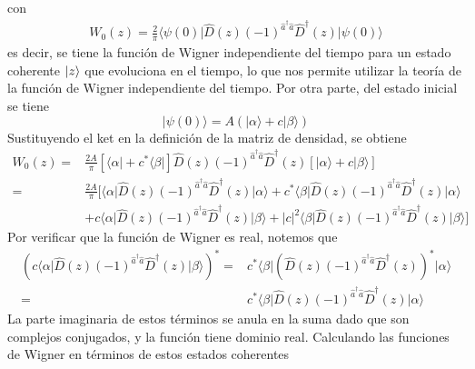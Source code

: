con
\begin{align*}
  W_{0}(z) = \frac{2}{\pi} \langle \psi(0)\vert \hat{D}(z) (-1)^{\hat{a}^{\dagger}\hat{a}} \hat{D}^{\dagger}(z) \vert \psi(0) \rangle
\end{align*}
es decir, se tiene la función de Wigner independiente del tiempo para un estado coherente $\ket{z}$ que evoluciona en el tiempo, lo que nos permite utilizar la teoría de la función de Wigner independiente del tiempo. Por otra parte, del estado inicial se tiene
\begin{equation*}
  \vert \psi(0) \rangle = A \left(\vert \alpha \rangle + c \vert  \beta\rangle \right)
\end{equation*}
Sustituyendo el ket en la definición de la matriz de densidad, se obtiene
\begin{align*}
  W_0(z) = & \frac{2A}{\pi} \left[ \langle \alpha \vert + c^* \langle \beta \vert \right] \hat{D}(z) (-1)^{\hat{a}^\dagger \hat{a}} \hat{D}^\dagger(z) \left[ \vert\alpha\rangle + c\vert \beta \rangle \right]                             \\
  =        & \frac{2A}{\pi} \bigg[ \langle \alpha \vert \hat{D}(z) (-1)^{\hat{a}^\dagger \hat{a}} \hat{D}^\dagger(z) \vert\alpha\rangle + c^* \langle \beta \vert \hat{D}(z) (-1)^{\hat{a}^\dagger \hat{a}} \hat{D}^\dagger(z) \vert\alpha\rangle \\ & + c \langle \alpha\vert \hat{D}(z) (-1)^{\hat{a}^\dagger \hat{a}} \hat{D}^\dagger(z) \vert\beta\rangle + |c|^2\langle \beta \vert \hat{D}(z) (-1)^{\hat{a}^\dagger \hat{a}} \hat{D}^\dagger(z) \vert\beta\rangle \bigg] \
\end{align*}
Por verificar que la función de Wigner es real, notemos que
\begin{align*}
  \left( c \langle \alpha\vert \hat{D}(z) (-1)^{\hat{a}^\dagger \hat{a}} \hat{D}^\dagger(z) \vert\beta\rangle \right)^* = & c^* \langle \beta\vert \left( \hat{D}(z) (-1)^{\hat{a}^\dagger \hat{a}} \hat{D}^\dagger(z) \right)^* \vert\alpha\rangle
  \\ =& c^* \langle \beta \vert \hat{D}(z) (-1)^{\hat{a}^\dagger \hat{a}} \hat{D}^\dagger(z) \vert\alpha\rangle
\end{align*}
La parte imaginaria de estos términos se anula en la suma dado que son complejos conjugados, y la función tiene dominio real. Calculando las funciones de Wigner en términos de estos estados coherentes
